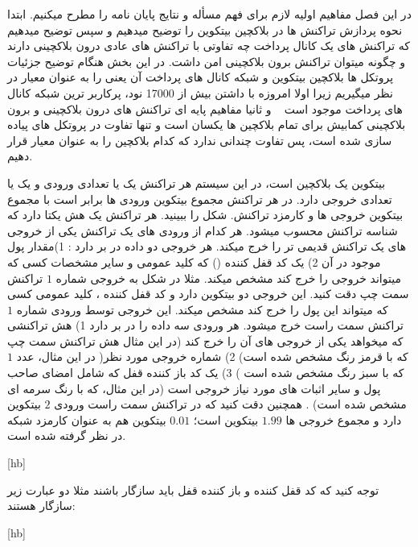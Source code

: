 
در این فصل مفاهیم اولیه لازم برای فهم مسأله و نتایج پایان نامه را مطرح میکنیم. ابتدا نحوه پردازش تراکنش ها در بلاکچین بیتکوین را توضیح میدهیم و سپس توضیح میدهیم که تراکنش های یک کانال پرداخت چه تفاوتی با تراکنش های عادی درون بلاکچینی دارند و چگونه میتوان تراکنش برون بلاکچینی امن داشت. در این بخش هنگام توضیح جزئیات پروتکل ها بلاکچین بیتکوین و شبکه کانال های پرداخت آن یعنی  را به عنوان معیار در نظر میگیریم زیرا اولا امروزه  با داشتن بیش از 17000 نود، پرکاربر ترین شبکه کانال های پرداخت موجود است 
~\cite{1ml}
و ثانیا مفاهیم پایه ای تراکنش های درون بلاکچینی و برون بلاکچینی کمابیش برای تمام بلاکچین ها یکسان است و تنها تفاوت در پروتکل های پیاده سازی شده است، پس تفاوت چندانی ندارد که کدام بلاکچین را به عنوان معیار قرار دهیم. 

بیتکوین یک بلاکچین  است، در این سیستم هر تراکنش یک یا تعدادی ورودی و یک یا تعدادی خروجی دارد. در هر تراکنش مجموع بیتکوین ورودی ها برابر است با مجموع بیتکوین خروجی ها و کارمزد تراکنش. شکل  را ببینید. هر تراکنش یک هش  یکتا دارد که شناسه تراکنش محسوب میشود. 
هر کدام از ورودی های یک تراکنش یکی از خروجی های یک تراکنش قدیمی تر را خرج میکند. هر خروجی دو داده در بر دارد : 1)مقدار پول موجود در آن 2) یک کد قفل کننده () که کلید عمومی  و سایر مشخصات کسی که میتواند خروجی را خرج کند مشخص میکند. 
مثلا در شکل  به خروجی شماره $1$ تراکنش سمت چپ دقت کنید. این خروجی دو بیتکوین دارد و  کد قفل کننده ، کلید عمومی کسی که میتواند این پول را خرج کند مشخص میکند. این خروجی توسط ورودی شماره $1$ تراکنش سمت راست خرج میشود. 
هر ورودی سه داده را در بر دارد 1) هش تراکنشی که میخواهد یکی از خروجی های آن را خرج کند (در این مثال هش تراکنش سمت چپ که با قرمز رنگ مشخص شده است) 2) شماره خروجی مورد نظر( در این مثال، عدد $1$ که با سبز رنگ مشخص شده است ) 3) یک کد باز کننده قفل که شامل امضای صاحب پول و سایر اثبات های مورد نیاز  خروجی است (در این مثال،  که با رنگ سرمه ای مشخص شده است) .  همچنین دقت کنید که در تراکنش سمت راست ورودی $2$ بیتکوین دارد و مجموع خروجی ها $1.99$ بیتکوین است؛ $0.01$ بیتکوین هم به عنوان کارمزد شبکه در نظر گرفته شده است.

 

[hb]


توجه کنید که کد قفل کننده و باز کننده قفل باید سازگار باشند مثلا دو عبارت زیر سازگار هستند:

[hb]

